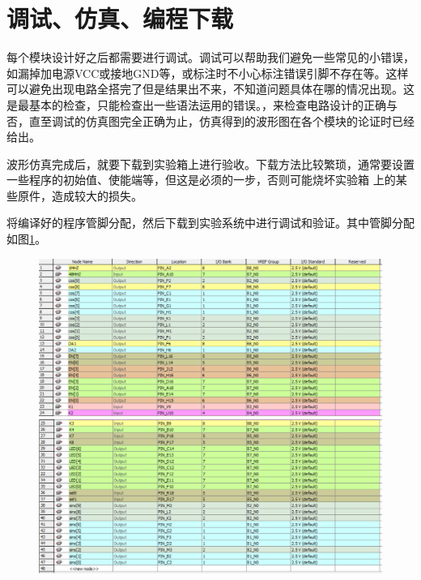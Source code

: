\documentclass[12pt]{article}
\begin{document}
\section{调试、仿真、编程下载}
每个模块设计好之后都需要进行调试。调试可以帮助我们避免一些常见的小错误，如漏掉加电源VCC或接地GND等，或标注时不小心标注错误引脚不存在等。这样可以避免出现电路全搭完了但是结果出不来，不知道问题具体在哪的情况出现。这是最基本的检查，只能检查出一些语法运用的错误。，来检查电路设计的正确与否，直至调试的仿真图完全正确为止，仿真得到的波形图在各个模块的论证时已经给出。 \par
波形仿真完成后，就要下载到实验箱上进行验收。下载方法比较繁琐，通常要设置一些程序的初始值、使能端等，但这是必须的一步，否则可能烧坏实验箱
上的某些原件，造成较大的损失。\par
将编译好的程序管脚分配，然后下载到实验系统中进行调试和验证。其中管脚分配如图\ref{fig:pins}。
\begin{figure}[hp]
	\centering  
	\includegraphics[width=\textwidth]{picture/pin1.png} 
	\includegraphics[width=\textwidth]{picture/pin2.png} 
	\caption{}
	\label{fig:pins}   
\end{figure}
\end{document}
